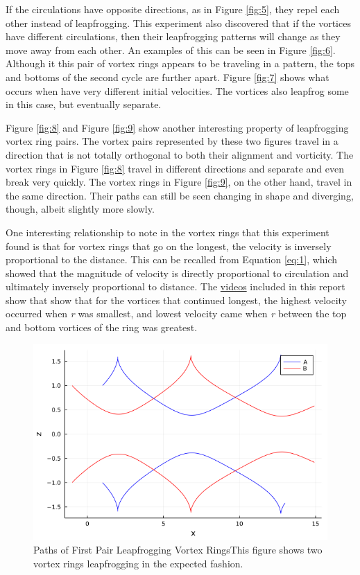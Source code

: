 \documentclass{article}
\begin{document}
If the circulations have opposite directions, as in Figure \ref{fig:5}, they repel each other instead of leapfrogging. This experiment also discovered that if the vortices have different circulations, then their leapfrogging patterns will change as they move away from each other. An examples of this can be seen in Figure \ref{fig:6}. Although it this pair of vortex rings appears to be traveling in a pattern, the tops and bottoms of the second cycle are further apart. Figure \ref{fig:7} shows what occurs when have very different initial velocities. The vortices also leapfrog some in this case, but eventually separate.\newline

Figure \ref{fig:8} and Figure \ref{fig:9} show another interesting property of leapfrogging vortex ring pairs. The vortex pairs represented by these two figures travel in a direction that is not totally orthogonal to both their alignment and vorticity. The vortex rings in Figure \ref{fig:8} travel in different directions and separate and even break very quickly. The vortex rings in Figure \ref{fig:9}, on the other hand, travel in the same direction. Their paths can still be seen changing in shape and diverging, though, albeit slightly more slowly. \newline

One interesting relationship to note in the vortex rings that this experiment found is that for vortex rings that go on the longest, the velocity is inversely proportional to the distance. This can be recalled from Equation \ref{eq:1}, which showed that the magnitude of velocity is directly proportional to circulation and ultimately inversely proportional to distance. The 
\href{https://imgur.com/U4cND6X,}{videos} included in this report show that show that for the vortices that continued longest, the highest velocity occurred when \emph{r} was smallest, and lowest velocity came when \emph{r} between the top and bottom vortices of the ring was greatest. \newline

\begin{figure}[htb]
	\centering
	\includegraphics[width=\textwidth]{Graph_A.png}
	\caption{Paths of First Pair Leapfrogging Vortex Rings\newline This figure shows two vortex rings leapfrogging in the expected fashion.}
	\label{fig:1}
\end{figure} 
\end{document}
